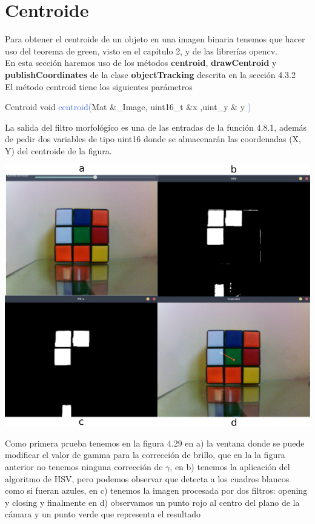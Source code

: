 \section{Centroide}
Para obtener el centroide de un objeto en una imagen binaria tenemos que hacer uso del
teorema de green, visto en el capítulo 2, y de las librerías opencv.\\
En esta sección haremos uso de los métodos \textbf{centroid}, \textbf{drawCentroid} y \textbf{publishCoordinates} de la clase
\textbf{objectTracking} descrita en la sección 4.3.2\\
El método centroid tiene los siguientes parámetros
\begin{example}[label={ex:serie}]{Centroid}
	\textcolor{Mulberry}{void} \textcolor{RoyalBlue}{centroid(}\textcolor{BurntOrange}{Mat}
	\textcolor{Mulberry}{\&}\textcolor{Bittersweet}{\_Image}, \textcolor{BurntOrange}{uint16\_t} \textcolor{Mulberry}{\&}\textcolor{Bittersweet}{x}
	,\textcolor{BurntOrange}{uint\_y} \textcolor{Mulberry}{\&} \textcolor{Bittersweet}{y}
	\textcolor{RoyalBlue}{)}
\end{example}
La salida del filtro morfológico es una de las entradas de la función 4.8.1, además de pedir dos variables de tipo uint16 donde
se almacenarán las coordenadas (X, Y) del centroide de la figura.
\begin{center}
	\includegraphics[width=0.45 \textwidth]{Contenido/Cuerpo/Capitulo4/Fig25.eps}
	\label{Fig9}
\end{center}
Como primera prueba tenemos en la figura 4.29 en a) la ventana donde se puede modificar el valor de gamma para la corrección de brillo, que en la
la figura anterior no tenemos ninguna corrección de $\gamma$, en b) tenemos la aplicación del algoritmo de HSV, pero podemos
observar que detecta a los cuadros blancos como si fueran azules, en c) tenemos la imagen procesada por dos filtros: opening
y closing y finalmente en d) observamos un punto rojo al centro del plano de la cámara y un punto verde que representa el resultado
